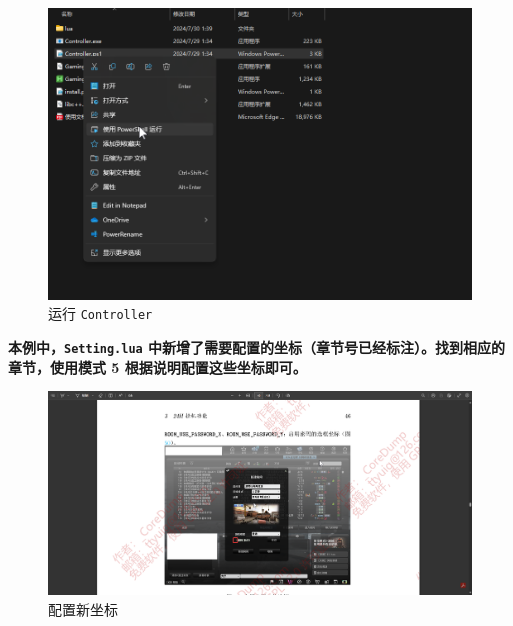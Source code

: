 \begin{figure}[H]
    \Centering
    \includegraphics[width=\textwidth]{docs/assets/update/run_new_controller.png}
    \caption{运行 \lstinline{Controller}}
\end{figure}

\textbf{\color{red} 本例中，\lstinline{Setting.lua} 中新增了需要配置的坐标（章节号已经标注）。找到相应的章节，使用模式 5 根据说明配置这些坐标即可。}

\begin{figure}[H]
    \Centering
    \includegraphics[width=\textwidth]{docs/assets/update/config_new_positions_00.png}
    \caption{配置新坐标}
\end{figure}

